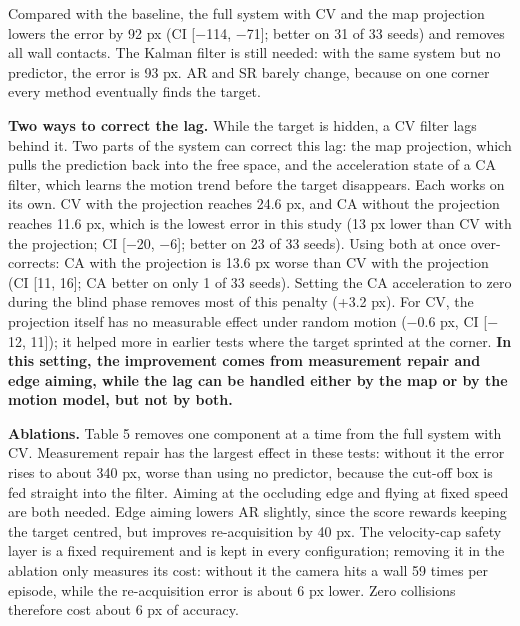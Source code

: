 \documentclass[12pt,a4paper]{article}
\begin{document}
Compared with the baseline, the full system with CV and the map projection lowers the error by 92 px (CI [$-$114, $-$71]; better on 31 of 33 seeds) and removes all wall contacts. The Kalman filter is still needed: with the same system but no predictor, the error is 93 px. AR and SR barely change, because on one corner every method eventually finds the target.

\textbf{Two ways to correct the lag.} While the target is hidden, a CV filter lags behind it. Two parts of the system can correct this lag: the map projection, which pulls the prediction back into the free space, and the acceleration state of a CA filter, which learns the motion trend before the target disappears. Each works on its own. CV with the projection reaches 24.6 px, and CA without the projection reaches 11.6 px, which is the lowest error in this study (13 px lower than CV with the projection; CI [$-$20, $-$6]; better on 23 of 33 seeds). Using both at once over-corrects: CA with the projection is 13.6 px worse than CV with the projection (CI [11, 16]; CA better on only 1 of 33 seeds). Setting the CA acceleration to zero during the blind phase removes most of this penalty (+3.2 px). For CV, the projection itself has no measurable effect under random motion ($-$0.6 px, CI [$-$12, 11]); it helped more in earlier tests where the target sprinted at the corner. \textbf{In this setting, the improvement comes from measurement repair and edge aiming, while the lag can be handled either by the map or by the motion model, but not by both.}

\textbf{Ablations.} Table 5 removes one component at a time from the full system with CV. Measurement repair has the largest effect in these tests: without it the error rises to about 340 px, worse than using no predictor, because the cut-off box is fed straight into the filter. Aiming at the occluding edge and flying at fixed speed are both needed. Edge aiming lowers AR slightly, since the score rewards keeping the target centred, but improves re-acquisition by 40 px. The velocity-cap safety layer is a fixed requirement and is kept in every configuration; removing it in the ablation only measures its cost: without it the camera hits a wall 59 times per episode, while the re-acquisition error is about 6 px lower. Zero collisions therefore cost about 6 px of accuracy.
\end{document}
